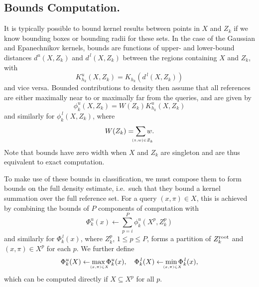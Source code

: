 \documentclass[twoside,leqno,twocolumn]{article}
\newcommand{\kdroot}[1]{#1^{\rm root}}
\newcommand{\lo}[1]{#1^{\,l}}
\newcommand{\hi}[1]{#1^u}
\newcommand{\leftlim}[1]{\lefteqn{\scriptscriptstyle #1}}
\begin{document}
\subsection{Bounds Computation.}
It is typically possible to bound kernel results between points in $X$
and $Z_k$ if we know bounding boxes or bounding radii for these sets.
In the case of the Gaussian and Epanechnikov kernels, bounds are
functions of upper- and lower-bound distances $\hi{d}(X,Z_k)$ and
$\lo{d}(X,Z_k)$ between the regions containing $X$ and $Z_k$, with
\begin{equation}
  \hi{K_{h_k}}(X,Z_k) = K_{h_k}(\lo{d}(X,Z_k))
\end{equation}
and vice versa.  Bounded contributions to density then assume that all
references are either maximally near to or maximally far from the
queries, and are given by
\begin{equation}
  \hi{\phi_k}(X,Z_k) = W(Z_k) \hi{K_{h_k}}(X,Z_k)
\end{equation}
and similarly for $\lo{\phi_k}(X,Z_k)$, where
\begin{equation}
  W(Z_k) = \sum_{\leftlim{(z,w) \in Z_k}} w .
\end{equation}
Note that bounds have zero width when $X$ and $Z_k$ are singleton and
are thus equivalent to exact computation.

To make use of these bounds in classification, we must compose them to
form bounds on the full density estimate, i.e.~such that they bound a
kernel summation over the full reference set.  For a query $(x,\pi)
\in X$, this is achieved by combining the bounds of $P$ components of
computation with
\begin{equation}\label{eqn:dens-bds}
  \hi{\Phi_k}(x) \gets \sum_{p=i}^{P} \hi{\phi_k}(X^p,Z_k^p)
\end{equation}
and similarly for $\lo{\Phi_k}(x)$, where $Z_k^p$, $1 \leq p \leq P$,
forms a partition of $\kdroot{Z_k}$ and $(x,\pi) \in X^p$ for each
$p$.  We further define
\begin{equation}
  \hi{\Phi_k}(X) \gets \max_{\leftlim{(x,\pi) \in X}} \hi{\Phi_k}(x) , \quad \lo{\Phi_k}(X) \gets \min_{\leftlim{(x,\pi) \in X}} \lo{\Phi_k}(x) ,
\end{equation}
which can be computed directly if $X \subseteq X^p$ for all $p$.
\end{document}
